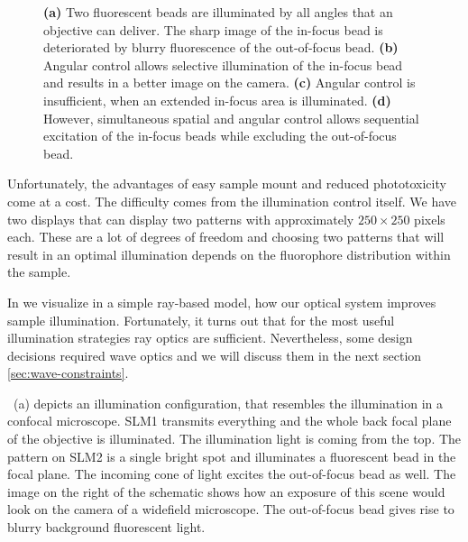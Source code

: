 \begin{figure}[!hbt]
  \centering
  \def\svgscale{.43}
  
  \caption{{\bf (a)} Two fluorescent beads are illuminated by all
    angles that an objective can deliver. The sharp image of the
    in-focus bead is deteriorated by blurry fluorescence of the
    out-of-focus bead. {\bf (b)} Angular control allows selective
    illumination of the in-focus bead and results in a better image on
    the camera. {\bf (c)} Angular control is insufficient, when an
    extended in-focus area is illuminated. {\bf (d)} However,
    simultaneous spatial and angular control allows sequential
    excitation of the in-focus beads while excluding the out-of-focus
    bead.}
  \label{fig:hourglass-all}
\end{figure}

Unfortunately, the advantages of easy sample mount and reduced
phototoxicity come at a cost. The difficulty comes from the
illumination control itself. We have two displays that can display two
patterns with approximately $250\times 250$ pixels each. These are a
lot of degrees of freedom and choosing two patterns that will result
in an optimal illumination depends on the fluorophore distribution
within the sample.


In  we visualize in a simple ray-based
model, how our optical system improves sample
illumination. Fortunately, it turns out that for the most useful
illumination strategies ray optics are sufficient. Nevertheless, some
design decisions required wave optics and we will discuss them in the
next section \ref{sec:wave-constraints}.

~(a) depicts an illumination configuration,
that resembles the illumination in a confocal microscope. SLM1
transmits everything and the whole back focal plane of the objective
is illuminated. The illumination light is coming from the top.  The
pattern on SLM2 is a single bright spot and illuminates a fluorescent
bead in the focal plane. The incoming cone of light excites the
out-of-focus bead as well. The image on the right of the schematic
shows how an exposure of this scene would look on the camera of a
widefield microscope. The out-of-focus bead gives rise to blurry
background fluorescent light.

